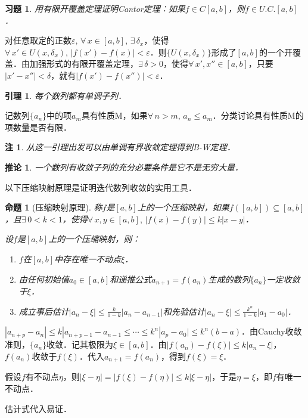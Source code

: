 \documentclass[11pt,a4paper]{ctexart}
\makeatletter
\theoremstyle{thmseries} %
\newtheorem{cor}{推论}[section]
\newtheorem{prop}{命题}[section]
\newtheorem{lem}{引理}[section]
\theoremstyle{exerseries}
\newtheorem{exer}{习题}[section]
\newtheorem*{rem}{注}
\renewenvironment{proof}[1][\proofname]{\par
  \pushQED{\qed}%
  \normalfont \topsep6\p@\@plus6\p@\relax
  \trivlist
  \item[\hskip\labelsep
        \itshape
    #1\@addpunct{}]\ignorespaces
}{%
  \popQED\endtrivlist\@endpefalse
}
\newenvironment{pf}{\begin{proof}[\bfseries\upshape 证\quad]}{\end{proof}}
\newcommand{\bra}[1]{\mathopen{}\left(#1\right)}
\renewcommand{\epsilon}{\varepsilon}
\makeatother
\begin{document}
\begin{exer}
	用有限开覆盖定理证明Cantor定理：如果$f\in C[a,b]$，则$f\in U.C.[a,b]$．
\end{exer}
\begin{pf}
	对任意取定的正数$\epsilon,\,\forall\,x\in[a,b],\,\exists\,\delta_x$，使得$\forall\,x'\in U(x,\delta_x),\,\left|f(x')-f(x)\right|<\epsilon$．则$\{U(x,\delta_x)\}$形成了$[a,b]$的一个开覆盖．由加强形式的有限开覆盖定理，$\exists\,\delta>0$，使得$\forall\,x',x''\in[a,b]$，只要$|x'-x''|<\delta$，就有$\left|f(x')-f(x'')\right|<\epsilon$．
\end{pf}

\begin{lem}
	每个数列都有单调子列．
\end{lem}
\begin{pf}
	记数列$\{a_n\}$中的项$a_m$具有性质M，如果$\forall\,n>m,\,a_n\leq a_m$．分类讨论具有性质M的项数量是否有限．
\end{pf}
\begin{rem}
	从这一引理出发可以由单调有界收敛定理得到B-W定理．
\end{rem}

\begin{cor}
	一个数列有收敛子列的充分必要条件是它不是无穷大量．
\end{cor}

以下压缩映射原理是证明迭代数列收敛的实用工具．
\begin{prop}[压缩映射原理]
	称$f$是$[a,b]$上的一个压缩映射，如果$f\bra{[a,b]}\subseteq[a,b]$，且$\exists\,0<k<1$，使得$\forall\,x,y\in[a,b],\,|f(x)-f(y)|\leq k|x-y|$．

	设$f$是$[a,b]$上的一个压缩映射，则：
	\begin{enumerate}
		\item $f$在$[a,b]$中存在唯一不动点$\xi$．
		\item 由任何初始值$a_0\in[a,b]$和递推公式$a_{n+1}=f(a_n)$生成的数列$\{a_n\}$一定收敛于$\xi$．
		\item 成立事后估计$|a_n-\xi|\leq\frac{k}{1-k}|a_n-a_{n-1}|$和先验估计$|a_n-\xi|\leq\frac{k^n}{1-k}|a_1-a_0|$．
	\end{enumerate}
\end{prop}
\begin{pf}
	$|a_{n+p}-a_n|\leq k|a_{n+p-1}-a_{n-1}\leq\cdots\leq k^n|a_p-a_0|\leq k^n(b-a)$．由Cauchy收敛准则，$\{a_n\}$收敛．记其极限为$\xi\in[a,b]$．由$|f(a_n)-f(\xi)|\leq k|a_n-\xi|$，$f(a_n)$收敛于$f(\xi)$．代入$a_{n+1}=f(a_n)$，得到$f(\xi)=\xi$．

	假设$f$有不动点$\eta$，则$|\xi-\eta|=|f(\xi)-f(\eta)|\leq k|\xi-\eta|$，于是$\eta=\xi$，即$f$有唯一不动点．

	估计式代入易证．
\end{pf}
\end{document}
